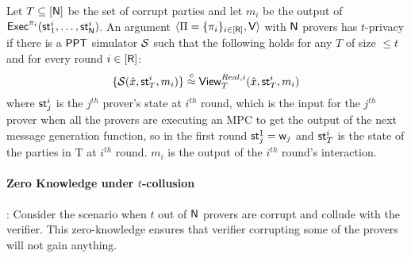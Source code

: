 \begin{definition}
Let $T\subseteq [\mathsf{N}]$ be the set of corrupt parties and let $m_i$ be the output of $\mathsf{Exec}^{\pi_i}(\mathsf{st}^i_1, \ldots, \mathsf{st}^i_{\mathsf{N}})$. An argument $\langle \Pi = \{\pi_i\}_{i \in [\mathsf{R}]},\mathsf{V}\rangle$ with $\mathsf{N}$ provers has $t$-privacy if there is a $\mathsf{PPT}$ simulator $\mathcal{S}$ such that the following holds for any $T$ of size $\leq t$ and for every round $i \in [\mathsf{R}]$: 
\[
 \{ \mathcal{S} (\hat{x}, \mathsf{st}^i_T, m_i) \} \stackrel{c}{\approx}  \mathsf{View}^{Real, i}_T ( \hat{x}, \mathsf{st}^i_T, m_i) 
\]
where $\mathsf{st}^i_j$ is the $j^{th}$ prover's state at $i^{th}$ round, which is the input for the $j^{th}$ prover when all the provers are executing an MPC to get the output of the next message generation function, so in the first round $\mathsf{st}^1_j = \mathsf{w}_j$ and $\mathsf{st}^i_T$ is the state of the parties in T at $i^{th}$ round. $m_i$ is the output of the $i^{th}$ round's interaction. 
\end{definition}

%

\paragraph{Zero Knowledge under $t$-collusion}: Consider the scenario when $t$ out of $\mathsf{N}$ provers are corrupt and collude with the verifier. This zero-knowledge ensures that verifier corrupting some of the provers will not gain anything.


